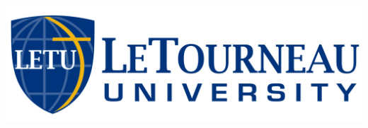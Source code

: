 \begin{titlepage}

{\large \datef{}}\\[2cm] %


\includegraphics[scale=0.20]{gfx/logoHoriz.jpg}\\[1cm] %
 

\vfill %
\end{titlepage}